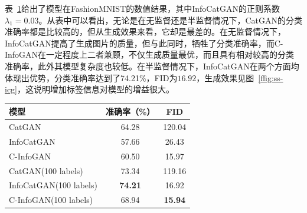 表~\ref{tab:fashion}给出了模型在FashionMNIST的数值结果，其中InfoCatGAN的正则系数$\lambda_1 = 0.03$。从表中可以看出，无论是在无监督还是半监督情况下，CatGAN的分类准确率都是比较高的，但从生成效果来看，它却是最差的。在无监督情况下，InfoCatGAN提高了生成图片的质量，但与此同时，牺牲了分类准确率，而C-InfoGAN在一定程度上二者兼顾，不仅生成质量最优，而且具有相对较高的分类准确率，此外其模型复杂度也较低。在半监督情况下，InfoCatGAN在两个方面均体现出优势，分类准确率达到了74.21\%，FID为$16.92$，生成效果见图~\ref{ffig:ss-icg}，这说明增加标签信息对模型的增益很大。
\begin{table}[htbp]
  \centering
  \label{tab:fashion}
  \begin{tabular}{lcc}
    \toprule
    \textbf{模型} & \textbf{准确率（\%）} & \textbf{FID} \\
    \midrule
    CatGAN & 64.28 & 120.04  \\ 
    InfoCatGAN & 57.66 & 26.43 \\ 
    C-InfoGAN & 60.50 & 15.97 \\ 
    CatGAN(100 labels) & 73.34 & 119.16 \\ 
    InfoCatGAN(100 labels) & \textbf{74.21} & 16.92 \\ 
    C-InfoGAN(100 labels) & 68.94 & \textbf{15.94} \\
    \bottomrule
  \end{tabular}
\end{table}

